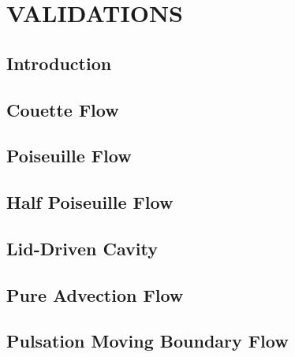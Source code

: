 \chapter{\textbf{VALIDATIONS}}
\label{validacao}

\section{\textbf{Introduction}} 


\section{\textbf{Couette Flow}} 
\label{couette}


\section{\textbf{Poiseuille Flow}} 
\label{poiseuille}


\section{\textbf{Half Poiseuille Flow}} 
\label{half poiseuille}


\section{\textbf{Lid-Driven Cavity}} 
\label{cavity}


\section{\textbf{Pure Advection Flow}} 
\label{convection}


\section{\textbf{Pulsation Moving Boundary Flow}} 
\label{pulsation}



